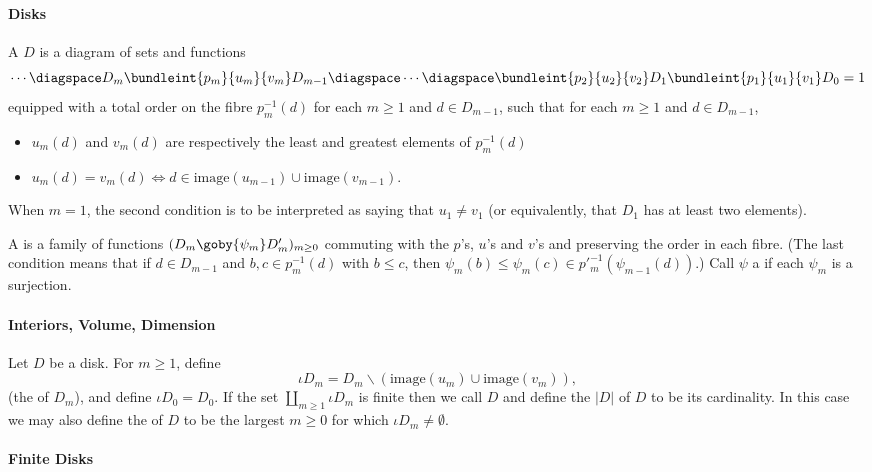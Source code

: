 
		\label{p:j}




\paragraph{Disks}

A  $D$ is a diagram of sets and functions
\vspace*{-3ex}
\[
\cdots\diagspace
D_m \bundleint{p_m}{u_m}{v_m} D_{m-1} 
\diagspace\cdots\diagspace
\bundleint{p_2}{u_2}{v_2} D_1
\bundleint{p_1}{u_1}{v_1} D_0 = 1
\]
equipped with a total order on the fibre $p_m^{-1}(d)$ for each $m\geq 1$
and $d\in D_{m-1}$, such that for each $m\geq 1$ and $d\in D_{m-1}$,
%
\begin{itemize}
\item $u_m(d)$ and $v_m(d)$ are respectively the least and greatest elements
of $p_m^{-1}(d)$
\item $u_m(d)=v_m(d) \iff d \in \textrm{image}(u_{m-1}) \cup
\textrm{image}(v_{m-1})$.
\end{itemize}
% 
When $m=1$, the second condition is to be interpreted as saying that $u_1\neq
v_1$ (or equivalently, that $D_1$ has at least two elements).

A  is a family of functions $(D_m
\goby{\psi_m} D'_m)_{m\geq 0}$ commuting with the $p$'s, $u$'s and $v$'s and
preserving the order in each fibre.  (The last condition means that if $d\in
D_{m-1}$ and $b,c\in p_m^{-1}(d)$ with $b\leq c$, then $\psi_m(b)\leq
\psi_m(c) \in p'^{-1}_m(\psi_{m-1}(d))$.)  Call $\psi$ a 
if each $\psi_m$ is a surjection.

\paragraph{Interiors, Volume, Dimension}

Let $D$ be a disk.  For $m\geq 1$, define
\[
\iota D_m = D_m \backslash (\textrm{image}(u_m) \cup 
\textrm{image}(v_m)),
\]
(the  of $D_m$), and define $\iota D_0 = D_0$.  If the set
$\coprod_{m\geq 1} \iota D_m$ is finite then we call $D$  and
define the  $|D|$ of $D$ to be its cardinality.  In this case
we may also define the  of $D$ to be the largest $m\geq 0$
for which $\iota D_m \neq \emptyset$.

\paragraph{Finite Disks}

